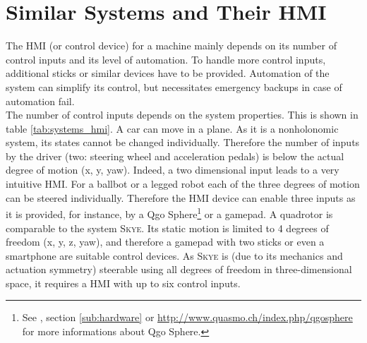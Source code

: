 \section{Similar Systems and Their HMI}
\label{sec:similar systems}
The HMI (or control device) for a machine mainly depends on its number of control inputs and its level of automation. To handle more control inputs, additional sticks or similar devices have to be provided. Automation of the system can simplify its control, but necessitates emergency backups in case of automation fail. \\
The number of control inputs depends on the system properties. This is shown in table \ref{tab:systems_hmi}. A car can move in a plane. As it is a nonholonomic system, its states cannot be changed individually. Therefore the number of inputs by the driver (two: steering wheel and acceleration pedals) is below the actual degree of motion (x, y, yaw). Indeed, a two dimensional input leads to a very intuitive HMI.
For a ballbot or a legged robot each of the three degrees of motion can be steered individually. Therefore the HMI device can enable three inputs as it is provided, for instance, by a Qgo Sphere\footnote{See \cite{kammermann}, section \ref{sub:hardware} or \url{http://www.quasmo.ch/index.php/qgosphere} for more informations about Qgo Sphere.} or a gamepad. A quadrotor is comparable to the system \textsc{Skye}. Its static motion is limited to 4 degrees of freedom (x, y, z, yaw), and therefore a gamepad with two sticks or even a smartphone are suitable control devices. As \textsc{Skye} is (due to its mechanics and actuation symmetry) steerable using all degrees of freedom in three-dimensional space, it requires a HMI with up to six control inputs.

